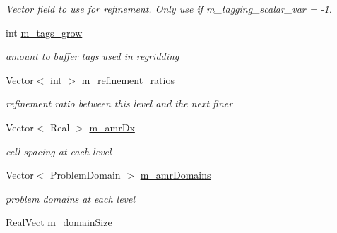 \begin{DoxyCompactItemize}
\begin{DoxyCompactList}\small\item\em Vector field to use for refinement. Only use if m\-\_\-tagging\-\_\-scalar\-\_\-var = -\/1. \end{DoxyCompactList}\item 
\hypertarget{classamr_mushy_layer_ad39218782bbab2d64037366cbd66dece}{int \hyperlink{classamr_mushy_layer_ad39218782bbab2d64037366cbd66dece}{m\-\_\-tags\-\_\-grow}}\label{classamr_mushy_layer_ad39218782bbab2d64037366cbd66dece}

\begin{DoxyCompactList}\small\item\em amount to buffer tags used in regridding \end{DoxyCompactList}\item 
\hypertarget{classamr_mushy_layer_a28320bd867ec84a74aa37258051eae9d}{Vector$<$ int $>$ \hyperlink{classamr_mushy_layer_a28320bd867ec84a74aa37258051eae9d}{m\-\_\-refinement\-\_\-ratios}}\label{classamr_mushy_layer_a28320bd867ec84a74aa37258051eae9d}

\begin{DoxyCompactList}\small\item\em refinement ratio between this level and the next finer \end{DoxyCompactList}\item 
\hypertarget{classamr_mushy_layer_ae29dfe7de99f9dbe2100c0ac43fbe2e8}{Vector$<$ Real $>$ \hyperlink{classamr_mushy_layer_ae29dfe7de99f9dbe2100c0ac43fbe2e8}{m\-\_\-amr\-Dx}}\label{classamr_mushy_layer_ae29dfe7de99f9dbe2100c0ac43fbe2e8}

\begin{DoxyCompactList}\small\item\em cell spacing at each level \end{DoxyCompactList}\item 
\hypertarget{classamr_mushy_layer_af1f126c4df9514671a9958e07b5269dd}{Vector$<$ Problem\-Domain $>$ \hyperlink{classamr_mushy_layer_af1f126c4df9514671a9958e07b5269dd}{m\-\_\-amr\-Domains}}\label{classamr_mushy_layer_af1f126c4df9514671a9958e07b5269dd}

\begin{DoxyCompactList}\small\item\em problem domains at each level \end{DoxyCompactList}\item 
\hypertarget{classamr_mushy_layer_a3367d021ac538dcd74929daa4e4ba637}{Real\-Vect \hyperlink{classamr_mushy_layer_a3367d021ac538dcd74929daa4e4ba637}{m\-\_\-domain\-Size}}\label{classamr_mushy_layer_a3367d021ac538dcd74929daa4e4ba637}


\end{DoxyCompactItemize}
